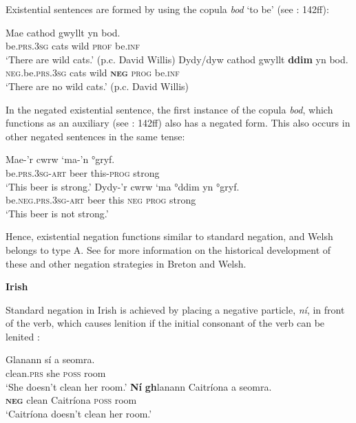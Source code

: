 ﻿\documentclass[output=paper]{langsci/langscibook}
\begin{document}
\begin{unindented}
Existential sentences are formed by using the copula \textit{bod} `to be' (see \citealt{King2003}: 142ff):
%
\begin{exe}\ex \gll Mae cathod  gwyllt  yn  bod.  \\
be.\textsc{prs.3sg}  cats  wild  \textsc{prof}  be.\textsc{inf} \\
    \glt `There are wild cats.' (p.c. David Willis)
\ex \gll Dydy/dyw cathod  gwyllt  \textbf{ddim}  yn   bod.  \\
\textsc{neg}.be.\textsc{prs.3sg}  cats  wild  \textbf{\textsc{neg}}  \textsc{prog}  be.\textsc{inf} \\
    \glt `There are no wild cats.' (p.c. David Willis)
    \end{exe}

In the negated existential sentence, the first instance of the copula \textit{bod}, which functions as an auxiliary (see \citealt{King2003}: 142ff) also has a negated form. This also occurs in other negated sentences in the same tense:
%
\begin{exe}\ex \gll Mae-’r cwrw `ma-'n     °gryf. \\
be.\textsc{prs.3sg-art} beer    this-\textsc{prog} strong \\
    \glt `This beer is strong.' \citep[146]{King2003}
\ex \gll Dydy-’r cwrw ‘ma °ddim yn   °gryf. \\
be.\textsc{neg.prs.3sg-art} beer this \textsc{neg} \textsc{prog} strong \\
    \glt `This beer is not strong.' \citep[146]{King2003}
    \end{exe}

Hence, existential negation functions similar to standard negation, and Welsh belongs to type A. See \citet{Willis2013} for more information on the historical development of these and other negation strategies in Breton and Welsh. 

\textbf{Irish}

Standard negation in Irish is achieved by placing a negative particle, \textit{ní}, in front of the verb, which causes lenition if the initial consonant of the verb can be lenited \citep[86]{Stenson2008}:
%
\begin{exe}\ex \gll Glanann  sí a seomra. \\
clean.\textsc{prs} she \textsc{poss} room \\
    \glt `She doesn't clean her room.' \citet[86]{Stenson2008}
\ex \gll \textbf{Ní} \textbf{gh}lanann Caitríona a seomra. \\
\textbf{\textsc{neg}} clean Caitríona \textsc{poss} room \\
    \glt `Caitríona doesn't clean her room.' \citet[86]{Stenson2008}
    \end{exe}


\end{unindented}
\end{document}
